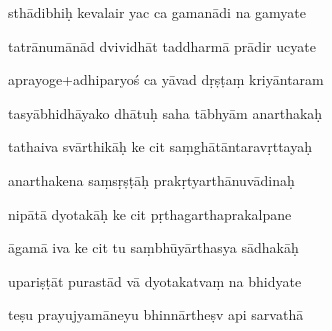 \documentclass[article,12pt,a4paper]{memoir}%
\newcounter{parCount}
\begin{document}
	  
	  \pstart {} sthādibhiḥ kevalair yac ca gamanādi na gamyate 
	{}
	\pend%
      

	  
	  \pstart \leavevmode%
	tatrānumānād dvividhāt taddharmā prādir ucyate 
	{}
	\pend%
      

	  
	  \pstart {} aprayoge+adhiparyoś ca yāvad dṛṣṭaṃ kriyāntaram 
	{}
	\pend%
      

	  
	  \pstart \leavevmode%
	tasyābhidhāyako dhātuḥ saha tābhyām anarthakaḥ 
	{}
	\pend%
      

	  
	  \pstart {} tathaiva svārthikāḥ ke cit   saṃghātāntaravṛttayaḥ 
	{}
	\pend%
      

	  
	  \pstart \leavevmode%
	anarthakena saṃsṛṣṭāḥ prakṛtyarthānuvādinaḥ 
	{}
	\pend%
      

	  
	  \pstart {} nipātā dyotakāḥ ke cit pṛthagarthaprakalpane 
	{}
	\pend%
      

	  
	  \pstart \leavevmode%
	āgamā iva ke cit tu saṃbhūyārthasya sādhakāḥ 
	{}
	\pend%
      

	  
	  \pstart {} upariṣṭāt purastād vā dyotakatvaṃ na bhidyate 
	{}
	\pend%
      

	  
	  \pstart \leavevmode%
	teṣu prayujyamāneyu bhinnārtheṣv api sarvathā 
	{}
	\pend%
      
\end{document}
